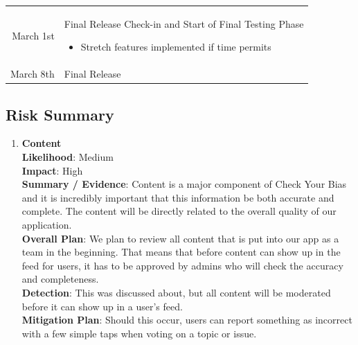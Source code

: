 \documentclass[11pt]{article}
\begin{document}
{\begin{tabular}{r |@{\foo} l}
March 1st & \parbox{\textwidth}{
Final Release Check-in and Start of Final Testing Phase
\vspace{-6pt}
\begin{itemize}
    \setlength\itemsep{0pt}
    \item Stretch features implemented if time permits
\end{itemize}
}\\[15pt]

March 8th & Final Release

\end{tabular}
}

\subsection{Risk Summary}

\begin{enumerate}[nolistsep]
    \item \textbf{Content}\\
        \textbf{Likelihood}: Medium\\
        \textbf{Impact}: High\\
        \textbf{Summary / Evidence}: Content is a major component of Check Your Bias and it is incredibly important that this information be both accurate and complete. The content will be directly related to the overall quality of our application.\\
        \textbf{Overall Plan}: We plan to review all content that is put into our app as a team in the beginning. That means that before content can show up in the feed for users, it has to be approved by admins who will check the accuracy and completeness.\\
        \textbf{Detection}: This was discussed about, but all content will be moderated before it can show up in a user's feed.\\
        \textbf{Mitigation Plan}: Should this occur, users can report something as incorrect with a few simple taps when voting on a topic or issue.\\[-10pt]


\end{enumerate}
\end{document}
